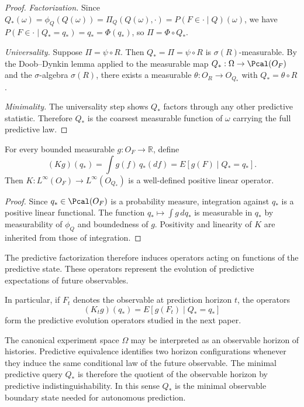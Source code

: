 \begin{proof}
\textit{Factorization.}
Since $Q_*(\omega)=\phi_Q(Q(\omega))=\Pi_Q(Q(\omega),\cdot)
=P(F\in\cdot\mid Q)(\omega)$, we have
$P(F\in\cdot\mid Q_*=q_*)=q_*=\Phi(q_*)$,
so $\Pi=\Phi\circ Q_*$.

\textit{Universality.}
Suppose $\Pi=\psi\circ R$.  Then $Q_*=\Pi=\psi\circ R$ is
$\sigma(R)$-measurable.  By the Doob--Dynkin lemma applied to the
measurable map $Q_*:\Omega\to\Pcal(O_F)$ and the $\sigma$-algebra
$\sigma(R)$, there exists a measurable $\theta:O_R\to O_{Q_*}$ with
$Q_*=\theta\circ R$.

\textit{Minimality.}
The universality step shows $Q_*$ factors through any other predictive
statistic.  Therefore $Q_*$ is the coarsest measurable function of
$\omega$ carrying the full predictive law.
\end{proof}

\begin{corollary}\label{cor:canonical-operator}
For every bounded measurable $g:O_F\to\mathbb R$, define
\[
(K g)(q_*)
=
\int g(f)\,q_*(df)
=
E[g(F)\mid Q_*=q_*].
\]
Then $K:L^\infty(O_F)\to L^\infty(O_{Q_*})$ is a well-defined positive
linear operator.
\end{corollary}

\begin{proof}
Since $q_*\in\Pcal(O_F)$ is a probability measure, integration against
$q_*$ is a positive linear functional.  The function $q_*\mapsto\int g\,dq_*$
is measurable in $q_*$ by measurability of $\phi_Q$ and boundedness
of $g$.  Positivity and linearity of $K$ are inherited from those of
integration.
\end{proof}

\begin{remark}
The predictive factorization therefore induces operators acting on
functions of the predictive state.  These operators represent the
evolution of predictive expectations of future observables.

In particular, if $F_t$ denotes the observable at prediction horizon
$t$, the operators
\[
(K_t g)(q_*)=E[g(F_t)\mid Q_*=q_*]
\]
form the predictive evolution operators studied in the next paper.
\end{remark}

\begin{remark}
The canonical experiment space $\Omega$ may be interpreted as an
observable horizon of histories.  Predictive equivalence identifies
two horizon configurations whenever they induce the same conditional
law of the future observable.  The minimal predictive query $Q_*$ is
therefore the quotient of the observable horizon by predictive
indistinguishability.  In this sense $Q_*$ is the minimal observable
boundary state needed for autonomous prediction.
\end{remark}

